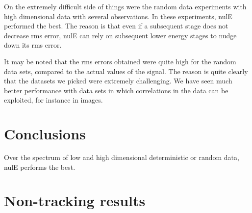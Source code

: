 On the extremely difficult side of things were the random data experiments with high dimensional data with several observations.  In these experiments, nulE performed the best.  The reason is that even if a subsequent stage does not decrease rms error, nulE can rely on subsequent lower energy stages to nudge down its rms error.  


It may be noted that the rms errors obtained were quite high for the random data sets, compared to the actual values of the signal.  The reason is quite clearly that the datasets we picked were extremely challenging.  We have seen much better performance with data sets in which correlations in the data can be exploited, for instance in images.

\section{Conclusions}
Over the spectrum of low and high dimensional deterministic or random data, nulE performs the best.



%

\newpage
\appendix
\section{Non-tracking results}

